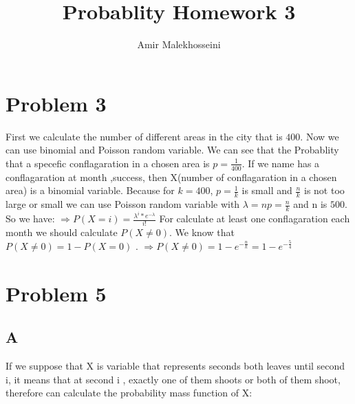 \documentclass[12pt]{article}
\title{Probablity Homework 3}
\author{Amir Malekhosseini}
\affil{Student id: 401100528}
\affil{Department of Mathematical Science, Sharif University Of Technology}
\begin{document}
\maketitle

\section*{Problem 3}
First we calculate the number of different areas in the city that is $ 400 $.
\newline Now we can use binomial and Poisson random variable.
\newline We can see that the Probablity that a specefic conflagaration in a chosen area is $ p = \frac{1}{400} $.
\newline If we name has a conflagaration at month ,success, then X(number of conflagaration in a chosen area) is a binomial variable.
\newline Because for $ k=400 $, $p = \frac{1}{k}$ is small and $\frac{n}{k}$ is not too large or small we can use Poisson random variable with $\lambda=np=\frac{n}{k}$ and n is $ 500 $. So we have:
\newline \newline $\Rightarrow P(X=i)=\frac{\lambda^{i} * e^{-\lambda}}{i!}$
\newline \newline For calculate at least one conflagaration each month we should calculate $P(X\neq 0)$.
\newline  We know that $ P(X\neq  0)=1-P(X=0)$ .
\newline \newline $\Rightarrow P(X\neq 0)=1 - e^{-\frac{n}{k}} = 1 - e^{-\frac{5}{4}} $

\section*{Problem 5}
\subsection*{A}
If we suppose that X is variable that represents seconds both leaves until
second i, it means that at second i , exactly one of them shoots or both of
them shoot, therefore can calculate the probability mass function of X:
\newline \newline
\end{document}
